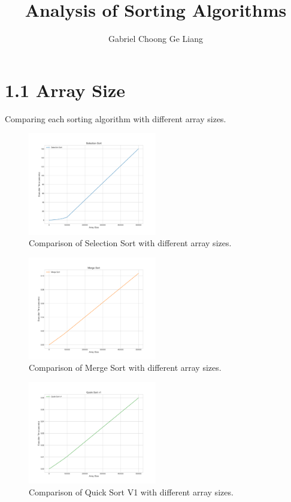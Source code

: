 \documentclass[12pt, letterpaper]{report}
\author{Gabriel Choong Ge Liang}
\title{Analysis of Sorting Algorithms}
\begin{document}
\maketitle

\section*{1.1 Array Size}
Comparing each sorting algorithm with different array sizes.

\begin{figure}[htbp]
    \centering
    \includegraphics[width=0.5\textwidth]{"../img/a_selection_sort.png"}
    \caption{Comparison of Selection Sort with different array sizes.}
    \label{fig:image1}
\end{figure}

\begin{figure}[htbp]
    \centering
    \includegraphics[width=0.5\textwidth]{"../img/a_merge_sort.png"}
    \caption{Comparison of Merge Sort with different array sizes.}
    \label{fig:image2}
\end{figure}

\begin{figure}[htbp]
    \centering
    \includegraphics[width=0.5\textwidth]{"../img/a_quick_sort_v1.png"}
    \caption{Comparison of Quick Sort V1 with different array sizes.}
    \label{fig:image3}
\end{figure}
\end{document}
